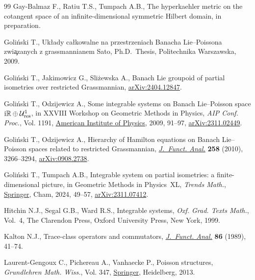\begin{thebibliography}{99}
Gay-Balmaz F., Ratiu T.S., Tumpach A.B., The hyperkaehler metric on the
 cotangent space of an infinite-dimensional symmetric {H}ilbert domain, in
 preparation.

Goli\'nski T., Uk{\l}ady ca{\l}kowalne na przestrzeniach {B}anacha
 {L}ie--{P}oissona zwi\c{a}zanych z grassmannianem {S}ato, Ph.D.~Thesis,
 {P}olitechnika Warszawska, 2009.

Goli\'nski T., Jakimowicz G., Sli\.{z}ewska A., Banach {L}ie groupoid of
 partial isometries over restricted {G}rassmannian, \href{https://arxiv.org/abs/2404.12847}{arXiv:2404.12847}.

Goli\'nski T., Odzijewicz A., Some integrable systems on {B}anach
 {L}ie--{P}oisson space ${\rm i}\mathbb{R}\oplus \mathcal{U}^1_{\textrm{res}}$, in
 {XXVIII} {W}orkshop on {G}eometric {M}ethods in {P}hysics, \textit{AIP Conf.
 Proc.}, Vol. 1191, \href{https://doi.org/10.1063/1.3275603}{American Institute of Physics}, 2009, 91--97,
 \href{https://arxiv.org/abs/2311.02449}{arXiv:2311.02449}.

Goli\'nski T., Odzijewicz A., Hierarchy of {H}amilton equations on {B}anach
 {L}ie--{P}oisson spaces related to restricted {G}rassmannian,
 \href{https://doi.org/10.1016/j.jfa.2010.01.019}{\textit{J.~Funct. Anal.}} \textbf{258} (2010), 3266--3294, \href{https://arxiv.org/abs/0908.2738}{arXiv:0908.2738}.

Goli\'nski T., Tumpach A.B., Integrable system on partial isometries: a
 finite-dimensional picture, in Geometric {M}ethods in {P}hysics~{XL}, \textit{Trends Math.}, \href{https://doi.org/10.1007/978-3-031-62407-0_5}{Springer}, Cham, 2024, 49--57, \href{https://arxiv.org/abs/2311.07412}{arXiv:2311.07412}.

Hitchin N.J., Segal G.B., Ward R.S., Integrable systems, \textit{Oxf. Grad.
 Texts Math.}, Vol.~4, The Clarendon Press, Oxford University Press, New York,
 1999.

Kalton N.J., Trace-class operators and commutators, \href{https://doi.org/10.1016/0022-1236(89)90064-5}{\textit{J.~Funct. Anal.}}
 \textbf{86} (1989), 41--74.

Laurent-Gengoux C., Pichereau A., Vanhaecke P., Poisson structures,
 \textit{Grundlehren Math. Wiss.}, Vol. 347, \href{https://doi.org/10.1007/978-3-642-31090-4}{Springer}, Heidelberg, 2013.


\end{thebibliography}
